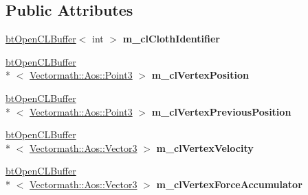 \subsection*{Public Attributes}
\begin{DoxyCompactItemize}
\item 
\hypertarget{classbt_soft_body_vertex_data_open_c_l_abc2623cd34a57b1bdd5ec5177d30c66e}{\hyperlink{classbt_open_c_l_buffer}{bt\+Open\+C\+L\+Buffer}$<$ int $>$ {\bfseries m\+\_\+cl\+Cloth\+Identifier}}\label{classbt_soft_body_vertex_data_open_c_l_abc2623cd34a57b1bdd5ec5177d30c66e}

\item 
\hypertarget{classbt_soft_body_vertex_data_open_c_l_a6945dc5d1d6b4a89d755f4b3a974823e}{\hyperlink{classbt_open_c_l_buffer}{bt\+Open\+C\+L\+Buffer}\\*
$<$ \hyperlink{class_vectormath_1_1_aos_1_1_point3}{Vectormath\+::\+Aos\+::\+Point3} $>$ {\bfseries m\+\_\+cl\+Vertex\+Position}}\label{classbt_soft_body_vertex_data_open_c_l_a6945dc5d1d6b4a89d755f4b3a974823e}

\item 
\hypertarget{classbt_soft_body_vertex_data_open_c_l_ae890e97e2d422a05788e42d9300b9899}{\hyperlink{classbt_open_c_l_buffer}{bt\+Open\+C\+L\+Buffer}\\*
$<$ \hyperlink{class_vectormath_1_1_aos_1_1_point3}{Vectormath\+::\+Aos\+::\+Point3} $>$ {\bfseries m\+\_\+cl\+Vertex\+Previous\+Position}}\label{classbt_soft_body_vertex_data_open_c_l_ae890e97e2d422a05788e42d9300b9899}

\item 
\hypertarget{classbt_soft_body_vertex_data_open_c_l_a6820abf661c1c286573c0596f3955abe}{\hyperlink{classbt_open_c_l_buffer}{bt\+Open\+C\+L\+Buffer}\\*
$<$ \hyperlink{class_vectormath_1_1_aos_1_1_vector3}{Vectormath\+::\+Aos\+::\+Vector3} $>$ {\bfseries m\+\_\+cl\+Vertex\+Velocity}}\label{classbt_soft_body_vertex_data_open_c_l_a6820abf661c1c286573c0596f3955abe}

\item 
\hypertarget{classbt_soft_body_vertex_data_open_c_l_ad827a67cc672c3cf5d3170c1bbc3511a}{\hyperlink{classbt_open_c_l_buffer}{bt\+Open\+C\+L\+Buffer}\\*
$<$ \hyperlink{class_vectormath_1_1_aos_1_1_vector3}{Vectormath\+::\+Aos\+::\+Vector3} $>$ {\bfseries m\+\_\+cl\+Vertex\+Force\+Accumulator}}\label{classbt_soft_body_vertex_data_open_c_l_ad827a67cc672c3cf5d3170c1bbc3511a}


\end{DoxyCompactItemize}
